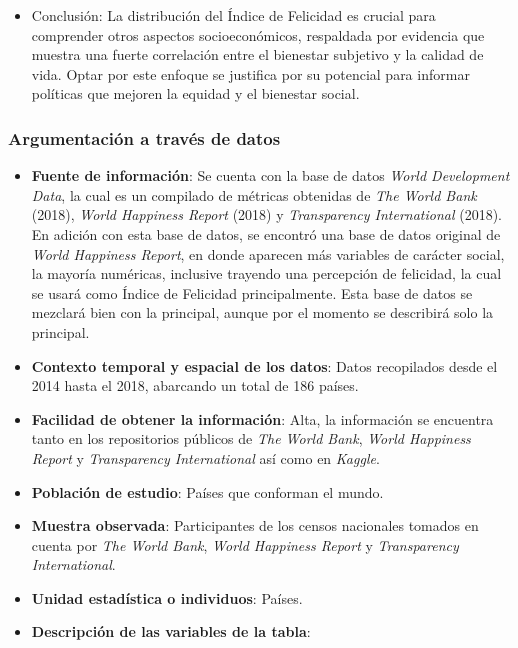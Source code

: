 \begin{itemize}
\begin{itemize}
    \end{itemize}
    \item Conclusión: La distribución del Índice de Felicidad es crucial para comprender otros aspectos socioeconómicos, respaldada por evidencia que muestra una fuerte correlación entre el bienestar subjetivo y la calidad de vida. Optar por este enfoque se justifica por su potencial para informar políticas que mejoren la equidad y el bienestar social.
\end{itemize}

\newpage
\subsubsection{Argumentación a través de datos}

\begin{itemize}
    \item \textbf{Fuente de información}: Se cuenta con la base de datos \textit{World Development Data}, la cual es un compilado de métricas obtenidas de \textit{The World Bank} (2018), \textit{World Happiness Report} (2018) y \textit{Transparency International} (2018). \\
    En adición con esta base de datos, se encontró una base de datos original de \textit{World Happiness Report}, en donde aparecen más variables de carácter social, la mayoría numéricas, inclusive trayendo una percepción de felicidad, la cual se usará como Índice de Felicidad principalmente. Esta base de datos se mezclará bien con la principal, aunque por el momento se describirá solo la principal. 
    \item \textbf{Contexto temporal y espacial de los datos}: Datos recopilados desde el 2014 hasta el 2018, abarcando un total de 186 países.
    \item \textbf{Facilidad de obtener la información}: Alta, la información se encuentra tanto en los repositorios públicos de \textit{The World Bank}, \textit{World Happiness Report} y \textit{Transparency International} así como en \textit{Kaggle}.
    \item \textbf{Población de estudio}: Países que conforman el mundo.
    \item \textbf{Muestra observada}: Participantes de los censos nacionales tomados en cuenta por \textit{The World Bank}, \textit{World Happiness Report} y \textit{Transparency International}.
    \item \textbf{Unidad estadística o individuos}: Países.
    \item \textbf{Descripción de las variables de la tabla}:

\end{itemize}
